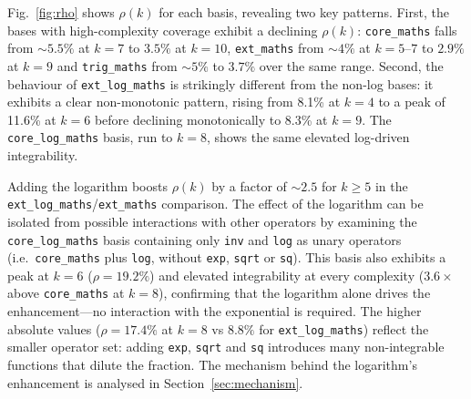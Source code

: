 \documentclass[preprint,12pt,authoryear]{elsarticle}
\newcommand{\rhok}{\rho(k)}
\newcommand{\hd}[1]{{\color{red}\textbf{[HD: #1]}}}
\begin{document}
Fig.~\ref{fig:rho} shows $\rhok$ for each basis, revealing two key patterns. First, the bases with high-complexity coverage exhibit a declining $\rhok$: \texttt{core\_maths} falls from $\sim 5.5\%$ at $k = 7$ to $3.5\%$ at $k = 10$, \texttt{ext\_maths} from $\sim 4\%$ at $k = 5$--$7$ to $2.9\%$ at $k=9$ and \texttt{trig\_maths} from $\sim 5\%$ to $3.7\%$ over the same range. Second, the behaviour of \texttt{ext\_log\_maths} is strikingly different from the non-log bases: it exhibits a clear non-monotonic pattern, rising from 8.1\% at $k=4$ to a peak of 11.6\% at $k=6$ before declining monotonically to 8.3\% at $k=9$. The \texttt{core\_log\_maths} basis, run to $k=8$, shows the same elevated log-driven integrability.

Adding the logarithm boosts $\rhok$ by a factor of $\sim 2.5$ for $k\geq 5$ in the \texttt{ext\_log\_maths}/\texttt{ext\_maths} comparison.
The effect of the logarithm can be isolated from possible interactions with other operators by examining the \texttt{core\_log\_maths} basis containing only \texttt{inv} and \texttt{log} as unary operators (i.e.\ \texttt{core\_maths} plus \texttt{log}, without \texttt{exp}, \texttt{sqrt} or \texttt{sq}). This basis also exhibits a peak at $k=6$ ($\rho = 19.2\%$) and elevated integrability at every complexity ($3.6\times$ above \texttt{core\_maths} at $k=8$), confirming that the logarithm alone drives the enhancement---no interaction with the exponential is required. The higher absolute values ($\rho = 17.4\%$ at $k=8$ vs $8.8\%$ for \texttt{ext\_log\_maths}) reflect the smaller operator set: adding \texttt{exp}, \texttt{sqrt} and \texttt{sq} introduces many non-integrable functions that dilute the fraction.
The mechanism behind the logarithm's enhancement is analysed in Section~\ref{sec:mechanism}.

\end{document}
